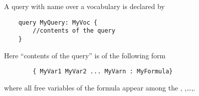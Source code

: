 
A query with name  over a vocabulary  is declared by
\begin{lstlisting}
	query MyQuery: MyVoc {
		//contents of the query
	}
\end{lstlisting}
Here ``contents of the query'' is of the following form 
\begin{lstlisting}
		{ MyVar1 MyVar2 ... MyVarn : MyFormula}
\end{lstlisting}
where all free  variables of the \fodot formula  appear among the , ,\ldots,.
